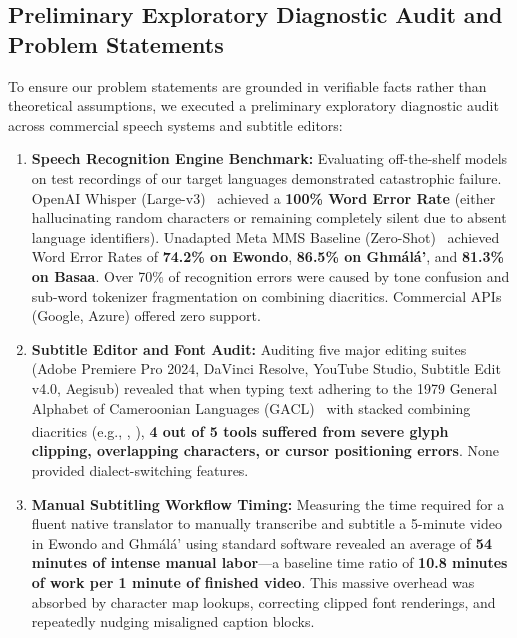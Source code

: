 \documentclass[conference]{IEEEtran}
\begin{document}
\subsection{Preliminary Exploratory Diagnostic Audit and Problem Statements}
\label{sec:intro:problem}

To ensure our problem statements are grounded in verifiable facts rather than theoretical assumptions, we executed a preliminary exploratory diagnostic audit across commercial speech systems and subtitle editors:
\begin{enumerate}
    \item \textbf{Speech Recognition Engine Benchmark:} Evaluating off-the-shelf models on test recordings of our target languages demonstrated catastrophic failure. OpenAI Whisper (Large-v3)~\cite{radford2023robust} achieved a \textbf{100\% Word Error Rate} (either hallucinating random characters or remaining completely silent due to absent language identifiers). Unadapted Meta MMS Baseline (Zero-Shot)~\cite{conneau2023fleurs} achieved Word Error Rates of \textbf{74.2\% on Ewondo}, \textbf{86.5\% on Gh\textopeno m\'al\'a'}, and \textbf{81.3\% on Basaa}. Over 70\% of recognition errors were caused by tone confusion and sub-word tokenizer fragmentation on combining diacritics. Commercial APIs (Google, Azure) offered zero support.
    \item \textbf{Subtitle Editor and Font Audit:} Auditing five major editing suites (Adobe Premiere Pro 2024, DaVinci Resolve, YouTube Studio, Subtitle Edit v4.0, Aegisub) revealed that when typing text adhering to the 1979 General Alphabet of Cameroonian Languages (GACL)~\cite{tadadjeu1979alphabet} with stacked combining diacritics (e.g., \textopeno\textsuperscript{\textasciiacute{}}, \textschwa\textsuperscript{\textasciigrave{}}), \textbf{4 out of 5 tools suffered from severe glyph clipping, overlapping characters, or cursor positioning errors}. None provided dialect-switching features.
    \item \textbf{Manual Subtitling Workflow Timing:} Measuring the time required for a fluent native translator to manually transcribe and subtitle a 5-minute video in Ewondo and Gh\textopeno m\'al\'a' using standard software revealed an average of \textbf{54 minutes of intense manual labor}---a baseline time ratio of \textbf{10.8 minutes of work per 1 minute of finished video}. This massive overhead was absorbed by character map lookups, correcting clipped font renderings, and repeatedly nudging misaligned caption blocks.
\end{enumerate}
\end{document}
